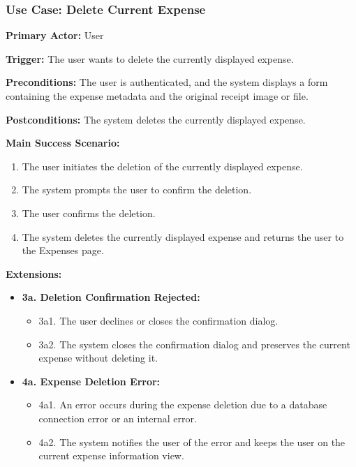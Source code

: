 \subsubsection{\textbf{Use Case: Delete Current Expense}}

\textbf{Primary Actor:} User

\textbf{Trigger:} The user wants to delete the currently displayed expense.

\textbf{Preconditions:} The user is authenticated, and the system displays a form containing the expense metadata and the original receipt image or file.

\textbf{Postconditions:} The system deletes the currently displayed expense.

\vspace{0.5cm}

\textbf{Main Success Scenario:}

\begin{enumerate} [leftmargin=0.75cm, noitemsep]
\item The user initiates the deletion of the currently displayed expense.
\item The system prompts the user to confirm the deletion.
\item The user confirms the deletion.
\item The system deletes the currently displayed expense and returns the user to the Expenses page.
\end{enumerate}

\vspace{0.3cm}

\textbf{Extensions:}

\begin{itemize} [label={}, leftmargin=0.75cm, noitemsep]

    \item \textbf{3a. Deletion Confirmation Rejected:}
    \begin{itemize} [label={}, leftmargin=0.75cm, noitemsep]
        \item 3a1. The user declines or closes the confirmation dialog.
        \item 3a2. The system closes the confirmation dialog and preserves the current expense without deleting it.
    \end{itemize}

    \item \textbf{4a. Expense Deletion Error:}
    \begin{itemize} [label={}, leftmargin=0.75cm, noitemsep]
        \item 4a1. An error occurs during the expense deletion due to a database connection error or an internal error.
        \item 4a2. The system notifies the user of the error and keeps the user on the current expense information view.
    \end{itemize}

\end{itemize}

\vspace{0.3cm}
